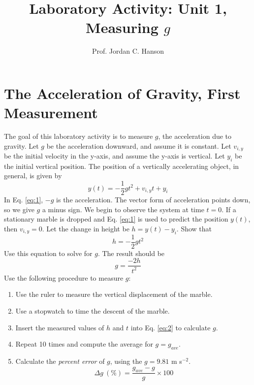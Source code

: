 \documentclass{article}
\begin{document}
\title{Laboratory Activity: Unit 1, Measuring $g$}
\author{Prof. Jordan C. Hanson}

\maketitle

\section{The Acceleration of Gravity, First Measurement}

The goal of this laboratory activity is to measure $g$, the acceleration due to gravity.  Let $g$ be the acceleration downward, and assume it is constant.  Let $v_{i,y}$ be the initial velocity in the y-axis, and assume the y-axis is vertical.  Let $y_i$ be the initial vertical position.  The position of a vertically accelerating object, in general, is given by
\begin{equation}
y(t) = -\frac{1}{2}gt^2 + v_{i,y} t + y_i \label{eq:1}
\end{equation}
In Eq. \ref{eq:1}, $-g$ is the acceleration.  The vector form of acceleration points down, so we give $g$ a minus sign.  We begin to observe the system at time $t=0$.  If a stationary marble is dropped and Eq. \ref{eq:1} is used to predict the position $y(t)$, then $v_{i,y} = 0$.  Let the change in height be $h = y(t) - y_i$.  Show that
\begin{equation}
h = -\frac{1}{2}g t^2
\end{equation}
Use this equation to solve for $g$.  The result should be
\begin{equation}
g = \frac{-2h}{t^2} \label{eq:2}
\end{equation}
Use the following procedure to measure $g$:
\begin{enumerate}
\item Use the ruler to measure the vertical displacement of the marble.
\item Use a stopwatch to time the descent of the marble.
\item Insert the measured values of $h$ and $t$ into Eq. \ref{eq:2} to calculate $g$.
\item Repeat 10 times and compute the average for $g = g_{ave}$.
\item Calculate the \textit{percent error} of $g$, using the $g = 9.81$ m s$^{-2}$.
\begin{equation}
\Delta g ~ (\%) = \frac{g_{ave} - g}{g} \times 100
\end{equation}
\end{enumerate}
\end{document}
